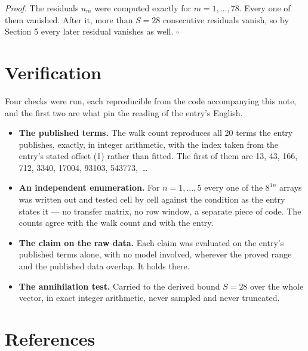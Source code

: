 \documentclass[11pt]{article}
\theoremstyle{definition}
\begin{document}
{\itshape Proof.} The residuals $u_m$ were computed exactly for $m = 1,\dots,78$. Every one of them vanished. After it, more than $S = 28$ consecutive residuals vanish, so by Section 5 every later residual vanishes as well. $\square$

\section{Verification}

Four checks were run, each reproducible from the code accompanying this note, and the first two are what pin the reading of the entry's English.

\begin{itemize}

\item {\bfseries The published terms.} The walk count reproduces all 20 terms the entry publishes, exactly, in integer arithmetic, with the index taken from the entry's stated offset (1) rather than fitted. The first of them are 13, 43, 166, 712, 3340, 17004, 93103, 543773,~\dots

\item {\bfseries An independent enumeration.} For $n = 1,\dots,5$ every one of the $8^{1n}$ arrays was written out and tested cell by cell against the condition as the entry states it --- no transfer matrix, no row window, a separate piece of code. The counts agree with the walk count and with the entry.

\item {\bfseries The claim on the raw data.} Each claim was evaluated on the entry's published terms alone, with no model involved, wherever the proved range and the published data overlap. It holds there.

\item {\bfseries The annihilation test.} Carried to the derived bound $S = 28$ over the whole vector, in exact integer arithmetic, never sampled and never truncated.

\end{itemize}

\section{References}
\end{document}
